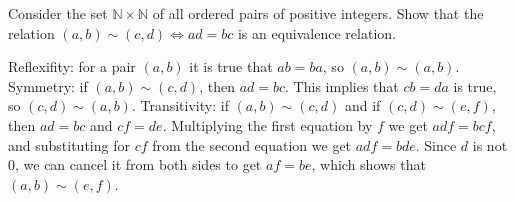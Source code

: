 \documentclass[solution, letterpaper]{cs20}
\begin{document}

Consider the set $\mathbb{N} \times \mathbb{N}$ of all ordered pairs of positive integers. Show that the relation $(a, b) \sim (c,d) \iff ad = bc$ is an equivalence relation.

\solution

\subsolution Reflexifity: for a pair $(a, b)$ it is true that $ab = ba$, so $(a, b) \sim (a, b)$.
\subsolution Symmetry: if $(a, b) \sim (c, d)$, then $ad = bc$. This implies that $cb = da$ is true, so $(c, d) \sim (a, b)$.
\subsolution Transitivity: if $(a, b) \sim (c, d)$ and if $(c, d) \sim (e, f)$, then $ad = bc$ and $cf = de$. Multiplying the first equation by $f$ we get $adf = bcf$, and substituting for $cf$ from the second equation we get $adf = bde$. Since $d$ is not 0, we can cancel it from both sides to get $af = be$, which shows that $(a, b) \sim (e, f)$.
\end{document}
